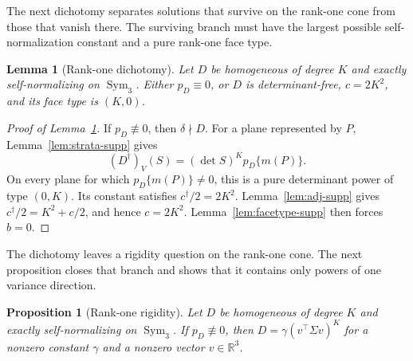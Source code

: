 \documentclass[12pt,a4paper]{article}
\theoremstyle{plain}
\newtheorem{lemma}{Lemma}
\newtheorem{proposition}{Proposition}
\theoremstyle{definition}
\newcommand{\R}{\mathbb{R}}
\newcommand{\Sym}{\operatorname{Sym}}
\begin{document}
The next dichotomy separates solutions that survive on the rank-one cone from those that vanish there.
The surviving branch must have the largest possible self-normalization constant and a pure rank-one face type.

\begin{lemma}[Rank-one dichotomy]
\label{lem:dichotomy-supp}
    Let $D$ be homogeneous of degree $K$ and exactly self-normalizing on $\Sym_3$.
    Either $p_D\equiv0$, or $D$ is determinant-free, $c=2K^2$, and its face type is $(K,0)$.
\end{lemma}

\begin{proof}[Proof of Lemma~\ref{lem:dichotomy-supp}]
    If $p_D\not\equiv0$, then $\delta\nmid D$.
    For a plane represented by $P$, Lemma~\ref{lem:strata-supp} gives
    \begin{equation*}
        (D^\dagger)_V(S)
        =
        (\det S)^Kp_D\{m(P)\}
        .
    \end{equation*}
    On every plane for which $p_D\{m(P)\}\ne0$, this is a pure determinant power of type $(0,K)$.
    Its constant satisfies $c^\dagger/2=2K^2$.
    Lemma~\ref{lem:adj-supp} gives $c^\dagger/2=K^2+c/2$, and hence $c=2K^2$.
    Lemma~\ref{lem:facetype-supp} then forces $b=0$.
\end{proof}

The dichotomy leaves a rigidity question on the rank-one cone.
The next proposition closes that branch and shows that it contains only powers of one variance direction.

\begin{proposition}[Rank-one rigidity]
\label{prop:rankone-supp}
    Let $D$ be homogeneous of degree $K$ and exactly self-normalizing on $\Sym_3$.
    If $p_D\not\equiv0$, then $D=\gamma(v^\top\Sigma v)^K$ for a nonzero constant $\gamma$ and a nonzero vector $v\in\R^3$.
\end{proposition}
\end{document}
